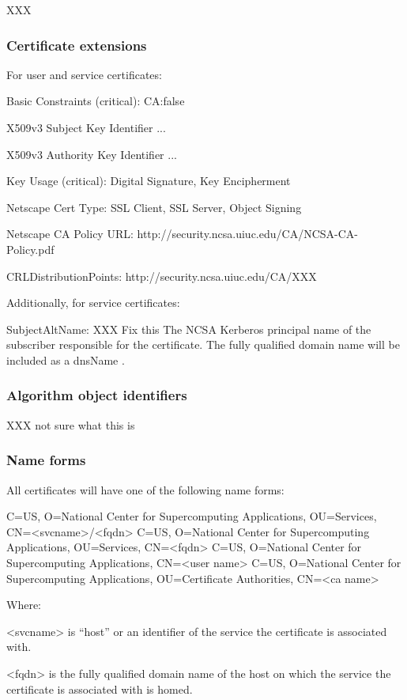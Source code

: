 \documentclass[10pt]{article}
\begin{document}
XXX

\subsubsection{Certificate extensions}


For user and service certificates:
   
Basic Constraints (critical): 
CA:false 

X509v3 Subject Key Identifier 
... 

X509v3 Authority Key Identifier 
... 

Key Usage (critical): 
Digital Signature, Key Encipherment 

Netscape Cert Type: 
SSL Client, SSL Server, Object Signing 

Netscape CA Policy URL: 
http://security.ncsa.uiuc.edu/CA/NCSA-CA-Policy.pdf

CRLDistributionPoints:
http://security.ncsa.uiuc.edu/CA/XXX

Additionally, for service certificates:

SubjectAltName:
XXX Fix this
The NCSA Kerberos principal name of the subscriber responsible for the
certificate. The fully qualified domain name will be included as a dnsName .

\subsubsection{Algorithm object identifiers}

XXX not sure what this is

\subsubsection{Name forms}

All certificates will have one of the following name forms:

C=US, O=National Center for Supercomputing Applications, OU=Services,
              CN=<svcname>/<fqdn>
C=US, O=National Center for Supercomputing Applications, OU=Services,
              CN=<fqdn>
C=US, O=National Center for Supercomputing Applications, CN=<user name>
C=US, O=National Center for Supercomputing Applications,
              OU=Certificate Authorities, CN=<ca name>

Where:

  <svcname> is ``host'' or an identifier of the service the
  certificate is associated with.

 <fqdn> is the fully qualified domain name of the host on which the
 service the certificate is associated with is homed.
\end{document}
